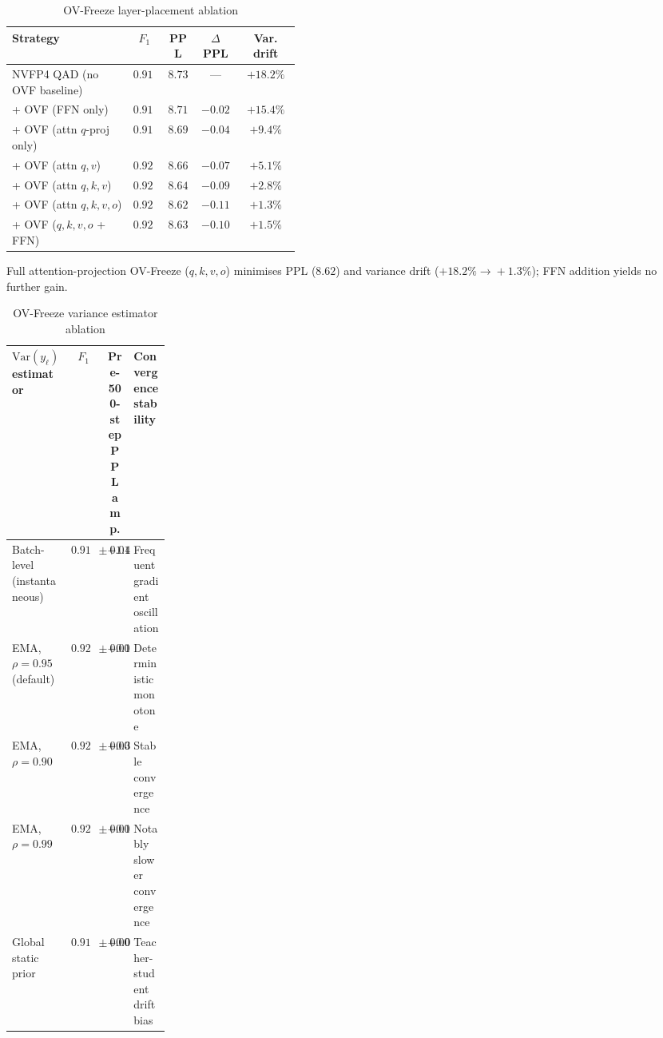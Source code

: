 \documentclass[11pt, a4paper]{article}
\begin{document}
\begin{table}[htbp]
\centering
\caption{OV-Freeze layer-placement ablation}
\label{tab:ovf_layer_ablation-en}
\small
\renewcommand{\arraystretch}{1.15}
\begin{tabular}{>{\raggedright\arraybackslash}p{0.42\linewidth}cccc}
\toprule
\textbf{Strategy} & \textbf{$F_1$} & \textbf{PPL} & \textbf{$\Delta$PPL} & \textbf{Var. drift} \\
\midrule
NVFP4 QAD (no OVF baseline) & $0.916$ & $8.73$ & --- & $+18.2\%$ \\
+ OVF (FFN only) & $0.918$ & $8.71$ & $-0.02$ & $+15.4\%$ \\
+ OVF (attn $q$-proj only) & $0.918$ & $8.69$ & $-0.04$ & $+9.4\%$ \\
+ OVF (attn $q, v$) & $0.920$ & $8.66$ & $-0.07$ & $+5.1\%$ \\
+ OVF (attn $q, k, v$) & $0.922$ & $8.64$ & $-0.09$ & $+2.8\%$ \\
+ OVF (attn $q, k, v, o$) & $\mathbf{0.923}$ & $\mathbf{8.62}$ & $\mathbf{-0.11}$ & $\mathbf{+1.3\%}$ \\
+ OVF ($q,k,v,o$ + FFN) & $0.922$ & $8.63$ & $-0.10$ & $+1.5\%$ \\
\bottomrule
\end{tabular}
\end{table}

Full attention-projection OV-Freeze ($q, k, v, o$) minimises PPL ($8.62$) and variance drift ($+18.2\%\!\rightarrow\!+1.3\%$); FFN addition yields no further gain.

\begin{table}[htbp]
\centering
\caption{OV-Freeze variance estimator ablation}
\label{tab:ovf_var_ablation-en}
\small
\renewcommand{\arraystretch}{1.15}
\begin{tabular}{lcc>{\centering\arraybackslash}p{0.23\linewidth}}
\toprule
\textbf{$\mathrm{Var}(y_\ell)$ estimator} & \textbf{$F_1$} & \textbf{Pre-500-step PPL amp.} & \textbf{Convergence stability} \\
\midrule
Batch-level (instantaneous) & $0.918 \pm 0.011$ & $+1.4$ & Frequent gradient oscillation \\
EMA, $\rho = 0.95$ (default) & $\mathbf{0.923 \pm 0.006}$ & $\mathbf{+0.18}$ & Deterministic monotone \\
EMA, $\rho = 0.90$ & $0.922 \pm 0.007$ & $+0.31$ & Stable convergence \\
EMA, $\rho = 0.99$ & $0.921 \pm 0.008$ & $+0.12$ & Notably slower convergence \\
Global static prior & $0.919 \pm 0.008$ & $+0.05$ & Teacher-student drift bias \\
\bottomrule
\end{tabular}
\end{table}
\end{document}
